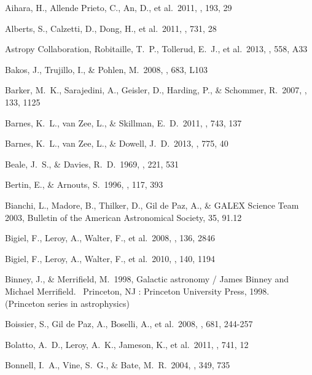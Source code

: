  Aihara, H., Allende Prieto, C., An, D., et al.\ 2011, \apjs, 193, 29 


 Alberts, S., Calzetti, D., Dong, H., et al.\ 2011, \apj, 731, 28 


 Astropy Collaboration, Robitaille, T.~P., Tollerud, E.~J., et al.\ 2013, \aap, 558, A33 

 Bakos, J., Trujillo, I., \& Pohlen, M.\ 2008, \apjl, 683, L103 


 Barker, M.~K., Sarajedini, A., Geisler, D., Harding, P., \& Schommer, R.\ 2007, \aj, 133, 1125 

 Barnes, K.~L., van Zee, L., \&
Skillman, E.~D.\ 2011, \apj, 743, 137 

 Barnes, K.~L., van Zee, L., \& Dowell, J.~D.\ 2013, \apj, 775, 40 

 Beale, J.~S., \& Davies, R.~D.\ 1969, \nat, 221, 531

 Bertin, E., \& Arnouts, S.\ 1996, \aaps, 117, 393 


 Bianchi, L., Madore, B., Thilker, D., Gil de Paz, A., \& GALEX Science Team 2003, Bulletin of the American Astronomical Society, 35, 91.12 


 Bigiel, F., Leroy, A., Walter, F., et al.\ 2008, \aj, 136, 2846 


 Bigiel, F., Leroy, A., Walter, F., et al.\ 2010, \aj, 140, 1194 

 Binney, J., \& Merrifield, M.\ 1998, Galactic astronomy / James Binney and Michael Merrifield.~ Princeton, NJ : Princeton University Press, 1998.~ (Princeton series in astrophysics)

 Boissier, S., Gil de Paz, A., Boselli, A., et al.\ 2008, \apj, 681, 244-257 


 Bolatto, A.~D., Leroy, A.~K., Jameson, K., et al.\ 2011, \apj, 741, 12 

 Bonnell, I.~A., Vine, S.~G., \& Bate, M.~R.\ 2004, \mnras, 349, 735

